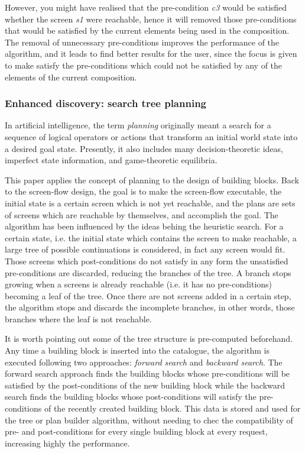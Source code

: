 However, you might have realised that the pre-condition \emph{c3} would be satisfied whether the screen \emph{s1} were 
reachable, hence it will removed those pre-conditions that would be satisfied by the current elements being used in
the composition. The removal of unnecessary pre-conditions improves the performance of the algorithm, and it leads to find
better results for the user, since the focus is given to make satisfy the pre-conditions which could not be satisfied
by any of the elements of the current composition.

\subsubsection{Enhanced discovery: search tree planning}
\label{sssec:planning}

In artiﬁcial intelligence, the term \emph{planning} originally meant a search for a sequence of logical operators or actions
that transform an initial world state into a desired goal state. Presently, it also includes many decision-theoretic ideas,
imperfect state information, and game-theoretic equilibria.

This paper applies the concept of planning to the design of building blocks. Back to the screen-flow design, the goal is to
make the screen-flow executable, the initial state is a certain screen which is not yet reachable, and the plans are sets of 
screens which are reachable by themselves, and accomplish the goal. The algorithm has been influenced by the ideas behing the 
heuristic search. For a certain state, i.e. the initial state which contains the screen to make reachable, a large tree of 
possible continuations is considered, in fact any screen would fit. Those screens which post-conditions do not satisfy in any
form the unsatisfied pre-conditions are discarded, reducing the branches of the tree. A branch stops growing when a screens is
already reachable (i.e. it has no pre-conditions) becoming a leaf of the tree. Once there are not screens added in a certain
step, the algorithm stops and discards the incomplete branches, in other words, those branches where the leaf is not reachable.

It is worth pointing out some of the tree structure is pre-computed beforehand. Any time a building block is inserted into the
catalogue, the algorithm is executed following two approaches: \emph{forward search} and \emph{backward search}. The forward
search approach finds the building blocks whose pre-conditions will be satisfied by the post-conditions of the new building 
block while the backward search finds the building blocks whose post-conditions will satisfy the pre-conditions of the recently
created building block. This data is stored and used for the tree or plan builder algorithm, without needing to chec the
compatibility of pre- and post-conditions for every single building block at every request, increasing highly the performance. 

